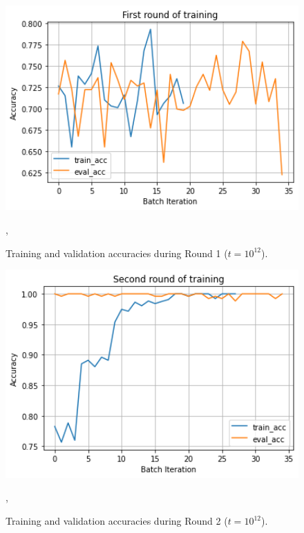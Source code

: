 \documentclass[twoside]{article}
\begin{document}
\begin{figure}
\includegraphics[width=1.0\textwidth]{Round1.png}
\caption[]{ 
 Training and validation accuracies during Round 1 ($t=10^{12}$).
 }
\vspace{1mm}, 
\label{fig:round1}
\end{figure}


\begin{figure}
\includegraphics[width=1.0\textwidth]{Round2.png}
\caption[]{ 
 Training and validation accuracies during Round 2 ($t=10^{12}$).
 }
\vspace{1mm}, 
\label{fig:round2}
\end{figure}
\end{document}
